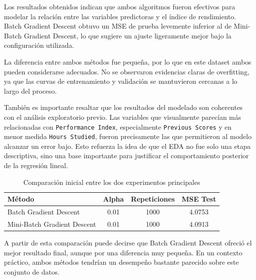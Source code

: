 \documentclass[conference]{IEEEtran}
\begin{document}
Los resultados obtenidos indican que ambos algoritmos fueron efectivos para modelar la relación entre las variables predictoras y el índice de rendimiento. Batch Gradient Descent obtuvo un MSE de prueba levemente inferior al de Mini-Batch Gradient Descent, lo que sugiere un ajuste ligeramente mejor bajo la configuración utilizada.

La diferencia entre ambos métodos fue pequeña, por lo que en este dataset ambos pueden considerarse adecuados. No se observaron evidencias claras de overfitting, ya que las curvas de entrenamiento y validación se mantuvieron cercanas a lo largo del proceso.

También es importante resaltar que los resultados del modelado son coherentes con el análisis exploratorio previo. Las variables que visualmente parecían más relacionadas con \texttt{Performance Index}, especialmente \texttt{Previous Scores} y en menor medida \texttt{Hours Studied}, fueron precisamente las que permitieron al modelo alcanzar un error bajo. Esto refuerza la idea de que el EDA no fue solo una etapa descriptiva, sino una base importante para justificar el comportamiento posterior de la regresión lineal.

\begin{table}[H]
\centering
\caption{Comparación inicial entre los dos experimentos principales}
\begin{tabular}{@{}lccc@{}}
\toprule
Método & Alpha & Repeticiones & MSE Test \\ \midrule
Batch Gradient Descent & 0.01 & 1000 & 4.0753 \\
Mini-Batch Gradient Descent & 0.01 & 1000 & 4.0913 \\ \bottomrule
\end{tabular}
\end{table}

A partir de esta comparación puede decirse que Batch Gradient Descent ofreció el mejor resultado final, aunque por una diferencia muy pequeña. En un contexto práctico, ambos métodos tendrían un desempeño bastante parecido sobre este conjunto de datos.
\end{document}
